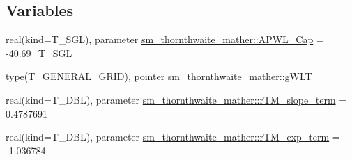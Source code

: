 \subsection*{Variables}
\begin{DoxyCompactItemize}
\item 
real(kind=T\_\-SGL), parameter \hyperlink{namespacesm__thornthwaite__mather_a3c2fee3b14d954659c5d846b6277217c}{sm\_\-thornthwaite\_\-mather::APWL\_\-Cap} = -\/40.69\_\-T\_\-SGL
\item 
type(T\_\-GENERAL\_\-GRID), pointer \hyperlink{namespacesm__thornthwaite__mather_afc44d31c08d31d440d84bf36d87547f4}{sm\_\-thornthwaite\_\-mather::gWLT}
\item 
real(kind=T\_\-DBL), parameter \hyperlink{namespacesm__thornthwaite__mather_aacf86966e860d48ccfc3dd81a5d95386}{sm\_\-thornthwaite\_\-mather::rTM\_\-slope\_\-term} = 0.4787691
\item 
real(kind=T\_\-DBL), parameter \hyperlink{namespacesm__thornthwaite__mather_a001111c742752b811654e00f9ae3fab4}{sm\_\-thornthwaite\_\-mather::rTM\_\-exp\_\-term} = -\/1.036784
\end{DoxyCompactItemize}
